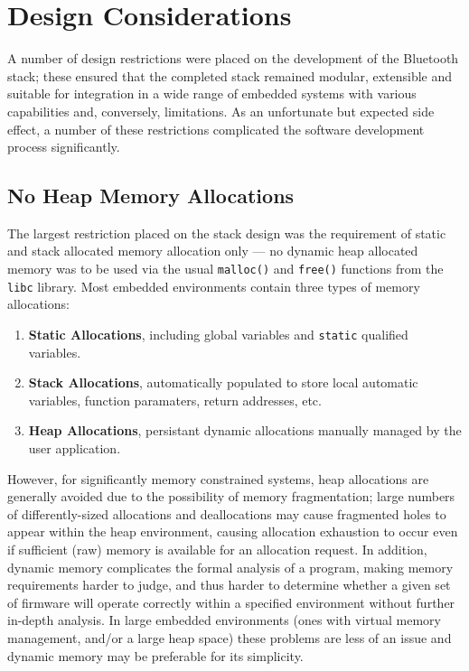 \section{Design Considerations}

A number of design restrictions were placed on the development of the Bluetooth stack; these ensured that the completed stack remained modular, extensible and suitable for integration in a wide range of embedded systems with various capabilities and, conversely, limitations. As an unfortunate but expected side effect, a number of these restrictions complicated the software development process significantly.

\FloatBarrier
\subsection{No Heap Memory Allocations}

The largest restriction placed on the stack design was the requirement of static and stack allocated memory allocation only --- no dynamic heap allocated memory was to be used via the usual \lstinline{malloc()} and \lstinline{free()} functions from the \texttt{libc} library. Most embedded environments contain three types of memory allocations:

\begin{enumerate}
	\item \textbf{Static Allocations}, including global variables and \lstinline{static} qualified variables.
	\item \textbf{Stack Allocations}, automatically populated to store local automatic variables, function paramaters, return addresses, etc.
	\item \textbf{Heap Allocations}, persistant dynamic allocations manually managed by the user application.
\end{enumerate}

However, for significantly memory constrained systems, heap allocations are generally avoided due to the possibility of memory fragmentation; large numbers of differently-sized allocations and deallocations may cause fragmented holes to appear within the heap environment, causing allocation exhaustion to occur even if sufficient (raw) memory is available for an allocation request. In addition, dynamic memory complicates the formal analysis of a program, making memory requirements harder to judge, and thus harder to determine whether a given set of firmware will operate correctly within a specified environment without further in-depth analysis. In large embedded environments (ones with virtual memory management, and/or a large heap space) these problems are less of an issue and dynamic memory may be preferable for its simplicity.

